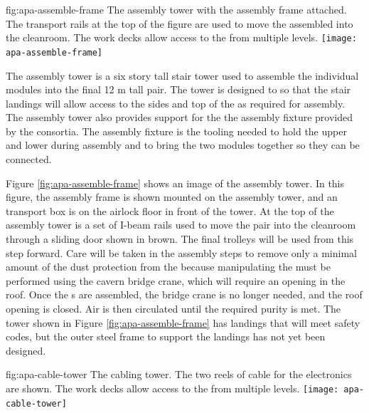
\begin{dunefigure}{fig:apa-assemble-frame}
  {The  assembly tower with the  assembly frame attached. The transport rails at the top of the figure are used to move the assembled  into the cleanroom. The work decks allow access to the  from multiple levels. }
\texttt{[image: apa-assemble-frame]}
\end{dunefigure}


The  assembly tower is a six story tall stair tower used to assemble the individual  modules into the final 12 \si{m} tall pair. 
The tower is designed to so that the stair landings will allow access to the sides and top of the  as required for assembly. 
The  assembly tower also provides support for the the  assembly fixture provided by the  consortia. 
The  assembly fixture is the tooling needed to hold the upper and lower  during assembly and to bring the two modules together so they can be connected. 

Figure \ref{fig:apa-assemble-frame} shows an image of the  assembly tower. 
In this figure, the  assembly frame is shown mounted on the assembly tower, and an  transport box is on the airlock floor in front of the tower. 
At the top of the  assembly tower is a set of I-beam rails used to move the  pair into the cleanroom through a sliding door shown in brown. 
The final trolleys will be used from this step forward. 
Care will be taken in the  assembly steps to remove only a minimal amount of the dust protection from the  because manipulating the  must be performed using the cavern bridge crane, which will require an opening in the roof. 
Once the s are assembled, the bridge crane is no longer needed, and the roof opening is closed. Air is then circulated until the required purity is met. The tower shown in Figure \ref{fig:apa-assemble-frame} has landings that will meet safety codes, but the outer steel frame to support the landings has not yet been designed.


\begin{dunefigure}{fig:apa-cable-tower}
  {The  cabling tower. The two reels of cable for the electronics are shown. The work decks allow access to the  from multiple levels. }
\texttt{[image: apa-cable-tower]}
\end{dunefigure}

